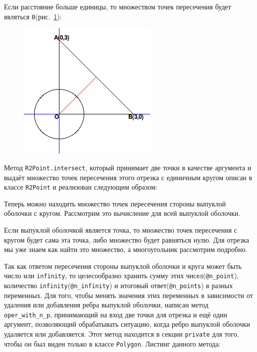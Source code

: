 Если расстояние больше единицы, то множеством точек пересечения будет 
являться \verb|0|(рис.~\ref{fig:ro_more}):
\begin{figure}[ht!]
\begin{center}
\includegraphics[scale=0.45]{images/ro_more}
\end{center}
\vspace*{-8mm}
\caption{}\label{fig:ro_more}
\end{figure}

Метод \verb|R2Point.intersect|, который принимает две точки в качестве 
аргумента и выдаёт множество точек пересечения этого отрезка с 
единичным кругом описан в классе \verb|R2Point| и реализован 
следующим образом:
\begin{small}

\end{small}

Теперь можно находить множество точек пересечения стороны выпуклой 
оболочки с кругом. Рассмотрим это вычисление для всей выпуклой оболочки.

Если выпуклой оболочкой является точка, то множество точек 
пересечения с кругом будет сама эта точка, либо множество будет 
равняться нулю. Для отрезка мы уже знаем как найти это множество, 
а многоугольник рассмотрим подробно.

Так как ответом пересечения стороны выпуклой оболочки и круга 
может быть число или \verb|infinity|, то целесообразно хранить сумму 
этих чисел(\verb|@n_point|), количество 
\verb|infinity|(\verb|@n_infinity|) и итоговый ответ(\verb|@n_points|) 
в разных переменных. Для того, чтобы менять значения этих переменных 
в зависимости от удаления или добавления ребра выпуклой оболочки, 
написан метод \verb|oper_with_n_p|, принимающий на вход две точки для 
отрезка и ещё один аргумент, позволяющий обрабатывать ситуацию, когда 
ребро выпуклой оболочки удаляется или добавляется. Этот метод 
находится в секции \verb|private| для того, чтобы он был виден 
только в классе \verb|Polygon|. Листинг данного метода:
\begin{small}

\end{small}

